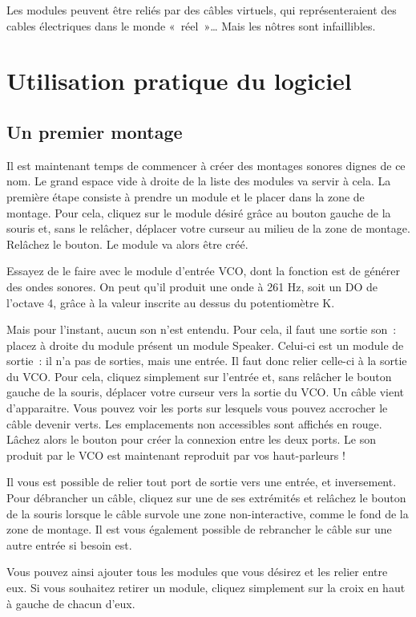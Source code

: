 \documentclass[a4paper,oneside,frenchb,10pt]{article}
\begin{document}
Les modules peuvent être reliés par des câbles virtuels, qui
représenteraient des cables électriques dans le monde «~réel~»\ldots{}
Mais les nôtres sont infaillibles.

\section{Utilisation pratique du logiciel}

\subsection{Un premier montage}

Il est maintenant temps de commencer à créer des montages sonores dignes
de ce nom. Le grand espace vide à droite de la liste des modules va
servir à cela. La première étape consiste à prendre un module et le
placer dans la zone de montage. Pour cela, cliquez sur le module désiré
grâce au bouton gauche de la souris et, sans le relâcher, déplacer votre
curseur au milieu de la zone de montage. Relâchez le bouton. Le module
va alors être créé.

Essayez de le faire avec le module d'entrée VCO, dont la fonction est de
générer des ondes sonores. On peut qu'il produit une onde à 261 Hz, soit
un DO de l'octave 4, grâce à la valeur inscrite au dessus du
potentiomètre K.

Mais pour l'instant, aucun son n'est entendu. Pour cela, il faut une
sortie son~: placez à droite du module présent un module Speaker.
Celui-ci est un module de sortie~: il n'a pas de sorties, mais une
entrée. Il faut donc relier celle-ci à la sortie du VCO. Pour cela,
cliquez simplement sur l'entrée et, sans relâcher le bouton gauche de la
souris, déplacer votre curseur vers la sortie du VCO. Un câble vient
d'apparaitre. Vous pouvez voir les ports sur lesquels vous pouvez
accrocher le câble devenir verts. Les emplacements non accessibles sont
affichés en rouge. Lâchez alors le bouton pour créer la connexion entre
les deux ports. Le son produit par le VCO est maintenant reproduit par
vos haut-parleurs !

Il vous est possible de relier tout port de sortie vers une entrée, et
inversement. Pour débrancher un câble, cliquez sur une de ses extrémités
et relâchez le bouton de la souris lorsque le câble survole une zone
non-interactive, comme le fond de la zone de montage. Il est vous
également possible de rebrancher le câble sur une autre entrée si besoin
est.

Vous pouvez ainsi ajouter tous les modules que vous désirez et les
relier entre eux. Si vous souhaitez retirer un module, cliquez
simplement sur la croix en haut à gauche de chacun d'eux.
\end{document}
